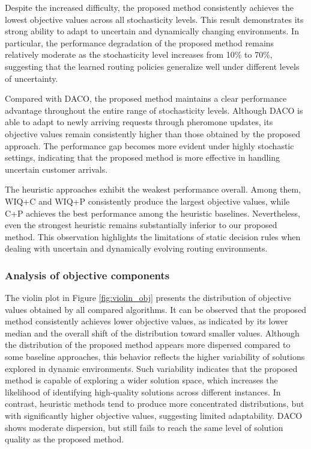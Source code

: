 \documentclass[pdflatex]{sn-jnl}
\begin{document}
Despite the increased difficulty, the proposed method consistently achieves the lowest objective values across all stochasticity levels. This result demonstrates its strong ability to adapt to uncertain and dynamically changing environments. In particular, the performance degradation of the proposed method remains relatively moderate as the stochasticity level increases from 10\% to 70\%, suggesting that the learned routing policies generalize well under different levels of uncertainty.

Compared with DACO, the proposed method maintains a clear performance advantage throughout the entire range of stochasticity levels. Although DACO is able to adapt to newly arriving requests through pheromone updates, its objective values remain consistently higher than those obtained by the proposed approach. The performance gap becomes more evident under highly stochastic settings, indicating that the proposed method is more effective in handling uncertain customer arrivals.

The heuristic approaches exhibit the weakest performance overall. Among them, WIQ+C and WIQ+P consistently produce the largest objective values, while C+P achieves the best performance among the heuristic baselines. Nevertheless, even the strongest heuristic remains substantially inferior to our proposed method. This observation highlights the limitations of static decision rules when dealing with uncertain and dynamically evolving routing environments.

\subsubsection{Analysis of objective components}
The violin plot in Figure \ref{fig:violin_obj} presents the distribution of objective values obtained by all compared algorithms. It can be observed that the proposed method consistently achieves lower objective values, as indicated by its lower median and the overall shift of the distribution toward smaller values. Although the distribution of the proposed method appears more dispersed compared to some baseline approaches, this behavior reflects the higher variability of solutions explored in dynamic environments. Such variability indicates that the proposed method is capable of exploring a wider solution space, which increases the likelihood of identifying high-quality solutions across different instances. In contrast, heuristic methods tend to produce more concentrated distributions, but with significantly higher objective values, suggesting limited adaptability. DACO shows moderate dispersion, but still fails to reach the same level of solution quality as the proposed method.
\end{document}
